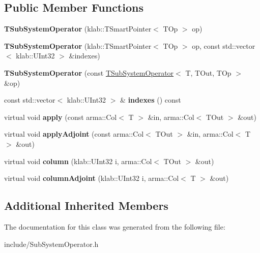 \subsection*{Public Member Functions}
\begin{DoxyCompactItemize}
\item 
{\bfseries T\+Sub\+System\+Operator} (klab\+::\+T\+Smart\+Pointer$<$ T\+Op $>$ op)\hypertarget{classkl1p_1_1TSubSystemOperator_a736e54552ee429a4423c0900fb4a1275}{}\label{classkl1p_1_1TSubSystemOperator_a736e54552ee429a4423c0900fb4a1275}

\item 
{\bfseries T\+Sub\+System\+Operator} (klab\+::\+T\+Smart\+Pointer$<$ T\+Op $>$ op, const std\+::vector$<$ klab\+::\+U\+Int32 $>$ \&indexes)\hypertarget{classkl1p_1_1TSubSystemOperator_a6d25043778b72694532e22af280bb541}{}\label{classkl1p_1_1TSubSystemOperator_a6d25043778b72694532e22af280bb541}

\item 
{\bfseries T\+Sub\+System\+Operator} (const \hyperlink{classkl1p_1_1TSubSystemOperator}{T\+Sub\+System\+Operator}$<$ T, T\+Out, T\+Op $>$ \&op)\hypertarget{classkl1p_1_1TSubSystemOperator_a69743f08438de240f12b2940c09107e1}{}\label{classkl1p_1_1TSubSystemOperator_a69743f08438de240f12b2940c09107e1}

\item 
const std\+::vector$<$ klab\+::\+U\+Int32 $>$ \& {\bfseries indexes} () const \hypertarget{classkl1p_1_1TSubSystemOperator_a1fc0734671fe5db43709ff980004a577}{}\label{classkl1p_1_1TSubSystemOperator_a1fc0734671fe5db43709ff980004a577}

\item 
virtual void {\bfseries apply} (const arma\+::\+Col$<$ T $>$ \&in, arma\+::\+Col$<$ T\+Out $>$ \&out)\hypertarget{classkl1p_1_1TSubSystemOperator_a55331ba8b806b825e37266046f95617e}{}\label{classkl1p_1_1TSubSystemOperator_a55331ba8b806b825e37266046f95617e}

\item 
virtual void {\bfseries apply\+Adjoint} (const arma\+::\+Col$<$ T\+Out $>$ \&in, arma\+::\+Col$<$ T $>$ \&out)\hypertarget{classkl1p_1_1TSubSystemOperator_a84e51fbe1239a08c9bf4af2224df61f9}{}\label{classkl1p_1_1TSubSystemOperator_a84e51fbe1239a08c9bf4af2224df61f9}

\item 
virtual void {\bfseries column} (klab\+::\+U\+Int32 i, arma\+::\+Col$<$ T\+Out $>$ \&out)\hypertarget{classkl1p_1_1TSubSystemOperator_a24c23aa90bc7b7ecd6c0ed83def0a9ca}{}\label{classkl1p_1_1TSubSystemOperator_a24c23aa90bc7b7ecd6c0ed83def0a9ca}

\item 
virtual void {\bfseries column\+Adjoint} (klab\+::\+U\+Int32 i, arma\+::\+Col$<$ T $>$ \&out)\hypertarget{classkl1p_1_1TSubSystemOperator_a602bc2402fe3848513799e26d43df822}{}\label{classkl1p_1_1TSubSystemOperator_a602bc2402fe3848513799e26d43df822}

\end{DoxyCompactItemize}
\subsection*{Additional Inherited Members}


The documentation for this class was generated from the following file\+:\begin{DoxyCompactItemize}
\item 
include/Sub\+System\+Operator.\+h\end{DoxyCompactItemize}
